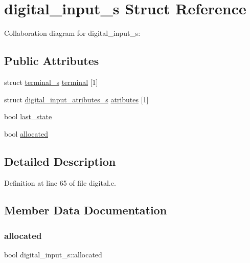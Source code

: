\hypertarget{structdigital__input__s}{}\section{digital\+\_\+input\+\_\+s Struct Reference}
\label{structdigital__input__s}


Collaboration diagram for digital\+\_\+input\+\_\+s\+:
\subsection*{Public Attributes}
\begin{DoxyCompactItemize}
\item 
struct \hyperlink{structterminal__s}{terminal\+\_\+s} \hyperlink{structdigital__input__s_a49e69af62c9177bbb3a94716de622112}{terminal} \mbox{[}1\mbox{]}
\item 
struct \hyperlink{structdigital__input__atributes__s}{digital\+\_\+input\+\_\+atributes\+\_\+s} \hyperlink{structdigital__input__s_a632405523a299371496e67e0ac52f865}{atributes} \mbox{[}1\mbox{]}
\item 
bool \hyperlink{structdigital__input__s_ad2789153648da72a5988b89dfa5d5b1e}{last\+\_\+state}
\item 
bool \hyperlink{structdigital__input__s_a3b8e3bd565b281d763c592e6bfe84a93}{allocated}
\end{DoxyCompactItemize}


\subsection{Detailed Description}


Definition at line 65 of file digital.\+c.



\subsection{Member Data Documentation}
\mbox{\label{structdigital__input__s_a3b8e3bd565b281d763c592e6bfe84a93}} 
\subsubsection{\texorpdfstring{allocated}{allocated}}
{\footnotesize\ttfamily bool digital\+\_\+input\+\_\+s\+::allocated}



